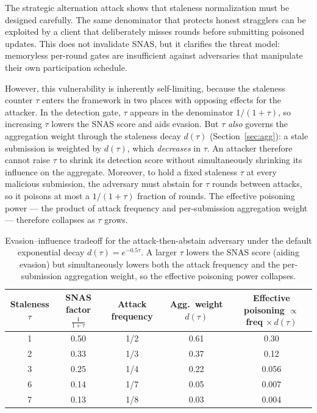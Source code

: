 \documentclass[pdflatex,sn-mathphys-num]{sn-jnl}
\begin{document}
The strategic alternation attack shows that staleness normalization must be designed carefully. The same denominator that protects honest stragglers can be exploited by a client that deliberately misses rounds before submitting poisoned updates. This does not invalidate SNAS, but it clarifies the threat model: memoryless per-round gates are insufficient against adversaries that manipulate their own participation schedule.

However, this vulnerability is inherently self-limiting, because the staleness counter $\tau$ enters the framework in two places with opposing effects for the attacker. In the detection gate, $\tau$ appears in the denominator $1/(1+\tau)$, so increasing $\tau$ lowers the SNAS score and aids evasion. But $\tau$ \emph{also} governs the aggregation weight through the staleness decay $d(\tau)$ (Section~\ref{sec:agg}): a stale submission is weighted by $d(\tau)$, which \emph{decreases} in $\tau$. An attacker therefore cannot raise $\tau$ to shrink its detection score without simultaneously shrinking its influence on the aggregate. Moreover, to hold a fixed staleness $\tau$ at every malicious submission, the adversary must abstain for $\tau$ rounds between attacks, so it poisons at most a $1/(1+\tau)$ fraction of rounds. The effective poisoning power --- the product of attack frequency and per-submission aggregation weight --- therefore collapses as $\tau$ grows.

\begin{table}[htbp]
\caption{Evasion--influence tradeoff for the attack-then-abstain adversary under the default exponential decay $d(\tau)=e^{-0.5\tau}$. A larger $\tau$ lowers the SNAS score (aiding evasion) but simultaneously lowers both the attack frequency and the per-submission aggregation weight, so the effective poisoning power collapses.}
\label{tab:tradeoff}
\centering
\begin{tabular}{ccccc}
\toprule
Staleness $\tau$ & SNAS factor $\tfrac{1}{1+\tau}$ & Attack frequency & Agg.\ weight $d(\tau)$ & Effective poisoning $\propto$ freq $\times\, d(\tau)$ \\
\midrule
1 & 0.50 & 1/2 & 0.61 & 0.30 \\
2 & 0.33 & 1/3 & 0.37 & 0.12 \\
3 & 0.25 & 1/4 & 0.22 & 0.056 \\
6 & 0.14 & 1/7 & 0.05 & 0.007 \\
7 & 0.13 & 1/8 & 0.03 & 0.004 \\
\bottomrule
\end{tabular}
\end{table}
\end{document}
